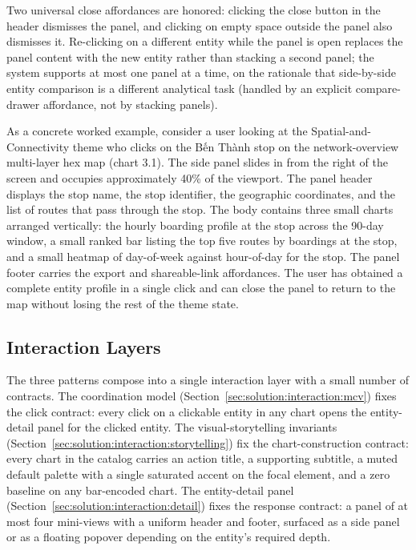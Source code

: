 Two universal close affordances are honored: clicking the close button
in the header dismisses the panel, and clicking on empty space outside
the panel also dismisses it. Re-clicking on a different entity while
the panel is open replaces the panel content with the new entity
rather than stacking a second panel; the system supports at most one
panel at a time, on the rationale that side-by-side entity comparison
is a different analytical task (handled by an explicit compare-drawer
affordance, not by stacking panels).

As a concrete worked example, consider a user looking at the
Spatial-and-Connectivity theme who clicks on the Bến Thành stop on the
network-overview multi-layer hex map (chart 3.1). The side panel
slides in from the right of the screen and occupies approximately
40\% of the viewport. The panel header displays the stop name, the
stop identifier, the geographic coordinates, and the list of routes
that pass through the stop. The body contains three small charts
arranged vertically: the hourly boarding profile at the stop across
the 90-day window, a small ranked bar listing the top five routes by
boardings at the stop, and a small heatmap of day-of-week against
hour-of-day for the stop. The panel footer carries the export and
shareable-link affordances. The user has obtained a complete entity
profile in a single click and can close the panel to return to the
map without losing the rest of the theme state.

\subsection{Interaction Layers}
\label{sec:solution:interaction:composition}

The three patterns compose into a single interaction layer with a
small number of contracts. The coordination model
(Section~\ref{sec:solution:interaction:mcv}) fixes the click contract:
every click on a clickable entity in any chart opens the
entity-detail panel for the clicked entity. The visual-storytelling
invariants (Section~\ref{sec:solution:interaction:storytelling}) fix
the chart-construction contract: every chart in the catalog carries
an action title, a supporting subtitle, a muted default palette with a
single saturated accent on the focal element, and a zero baseline on
any bar-encoded chart. The entity-detail panel
(Section~\ref{sec:solution:interaction:detail}) fixes the response
contract: a panel of at most four mini-views with a uniform header
and footer, surfaced as a side panel or as a floating popover
depending on the entity's required depth.

